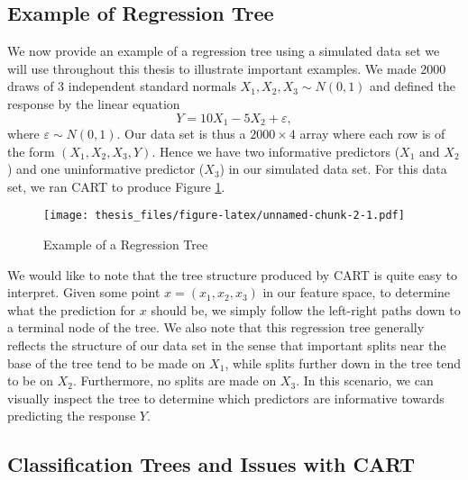 \documentclass[12pt,twoside]{reedthesis}
\theoremstyle{definition}
\theoremstyle{definition}
\theoremstyle{definition}
\theoremstyle{remark}
\begin{document}
\subsection{Example of Regression
Tree}\label{example-of-regression-tree}

We now provide an example of a regression tree using a simulated data
set we will use throughout this thesis to illustrate important examples.
We made 2000 draws of 3 independent standard normals
\(X_1,X_2,X_3\sim N(0,1)\) and defined the response by the linear
equation \[Y=10X_1-5X_2+\varepsilon,\] where \(\varepsilon\sim N(0,1)\).
Our data set is thus a \(2000\times 4\) array where each row is of the
form \((X_1,X_2,X_3,Y)\). Hence we have two informative predictors
(\(X_1\) and \(X_2\)) and one uninformative predictor (\(X_3\)) in our
simulated data set. For this data set, we ran CART to produce Figure
\ref{tree_ex}. \par  
\begin{figure}
\centering
\texttt{[image: thesis\_files/figure-latex/unnamed-chunk-2-1.pdf]}
\caption{\label{fig:unnamed-chunk-2}\label{tree_ex}Example of a Regression
Tree}
\end{figure}
We would like to note that the tree structure produced by CART is quite
easy to interpret. Given some point \(x=(x_1,x_2,x_3)\) in our feature
space, to determine what the prediction for \(x\) should be, we simply
follow the left-right paths down to a terminal node of the tree. We also
note that this regression tree generally reflects the structure of our
data set in the sense that important splits near the base of the tree
tend to be made on \(X_1\), while splits further down in the tree tend
to be on \(X_2\). Furthermore, no splits are made on \(X_3\). In this
scenario, we can visually inspect the tree to determine which predictors
are informative towards predicting the response \(Y\).

\subsection{Classification Trees and Issues with
CART}\label{classification-trees-and-issues-with-cart}
\end{document}

